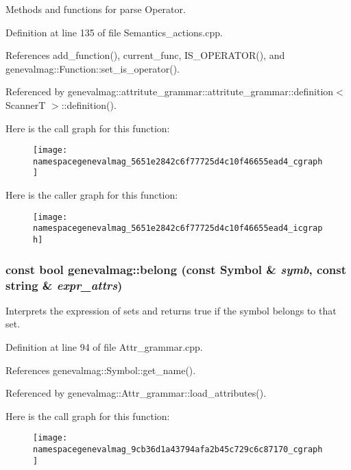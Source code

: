 Methods and functions for parse Operator. 

Definition at line 135 of file Semantics\_\-actions.cpp.

References add\_\-function(), current\_\-func, IS\_\-OPERATOR(), and genevalmag::Function::set\_\-is\_\-operator().

Referenced by genevalmag::attritute\_\-grammar::attritute\_\-grammar::definition$<$ ScannerT $>$::definition().

Here is the call graph for this function:\nopagebreak
\begin{figure}[H]
\begin{center}
\leavevmode
\texttt{[image: namespacegenevalmag\_5651e2842c6f77725d4c10f46655ead4\_cgraph]}
\end{center}
\end{figure}


Here is the caller graph for this function:\nopagebreak
\begin{figure}[H]
\begin{center}
\leavevmode
\texttt{[image: namespacegenevalmag\_5651e2842c6f77725d4c10f46655ead4\_icgraph]}
\end{center}
\end{figure}
\hypertarget{namespacegenevalmag_9cb36d1a43794afa2b45c729c6c87170}{
\subsubsection[{belong}]{\setlength{\rightskip}{0pt plus 5cm}const bool genevalmag::belong (const Symbol \& {\em symb}, \/  const string \& {\em expr\_\-attrs})}}
\label{namespacegenevalmag_9cb36d1a43794afa2b45c729c6c87170}


Interprets the expression of sets and returns true if the symbol belongs to that set. 

Definition at line 94 of file Attr\_\-grammar.cpp.

References genevalmag::Symbol::get\_\-name().

Referenced by genevalmag::Attr\_\-grammar::load\_\-attributes().

Here is the call graph for this function:\nopagebreak
\begin{figure}[H]
\begin{center}
\leavevmode
\texttt{[image: namespacegenevalmag\_9cb36d1a43794afa2b45c729c6c87170\_cgraph]}
\end{center}
\end{figure}


